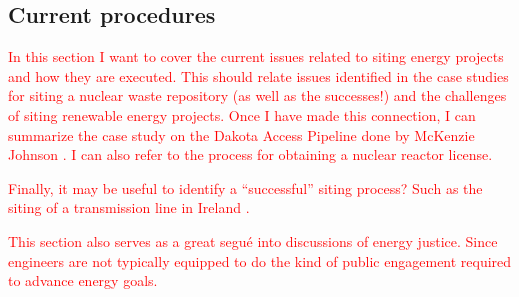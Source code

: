 \subsection{Current procedures}


\textcolor{red}{In this section I want to cover the current issues related to siting 
energy projects and how they are executed. This should relate issues identified in the case studies
for siting a nuclear waste repository (as well as the successes!) and the challenges of siting renewable
energy projects. Once I have made this connection, I can summarize the case study on the Dakota Access Pipeline
done by McKenzie Johnson \cite{johnson_dakota_2021}. I can also refer to the process for obtaining a nuclear
reactor license.

Finally, it may be useful to identify a ``successful'' siting process? Such as the siting of a transmission line
in Ireland \cite{devine-wright_understanding_2020}.


This section also serves as a great segu\'{e} into discussions of energy justice. Since engineers are not 
typically equipped to do the kind of public engagement required to advance energy goals.}
